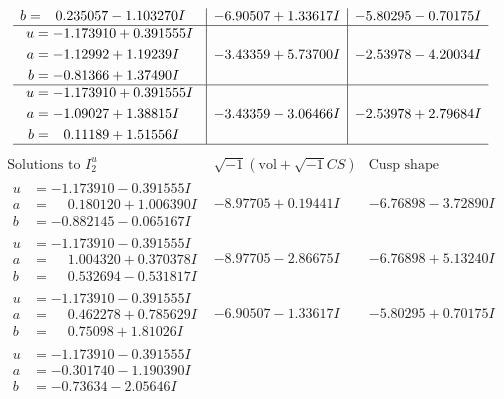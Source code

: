 \documentclass[1p]{elsarticle_modified}
\theoremstyle{definition}
\newcommand{\I}{\sqrt{-1}}
\begin{document}
$$\begin{array}{c|c|c}
\begin{aligned}
b &= \phantom{-}0.235057 - 1.103270 I\end{aligned}
 & -6.90507 + 1.33617 I & -5.80295 - 0.70175 I \\ \hline\begin{aligned}
u &= -1.173910 + 0.391555 I \\
a &= -1.12992 + 1.19239 I \\
b &= -0.81366 + 1.37490 I\end{aligned}
 & -3.43359 + 5.73700 I & -2.53978 - 4.20034 I \\ \hline\begin{aligned}
u &= -1.173910 + 0.391555 I \\
a &= -1.09027 + 1.38815 I \\
b &= \phantom{-}0.11189 + 1.51556 I\end{aligned}
 & -3.43359 - 3.06466 I & -2.53978 + 2.79684 I\\
 \hline 
 \end{array}$$\newpage$$\begin{array}{c|c|c}  
\text{Solutions to }I^u_{2}& \I (\text{vol} + \sqrt{-1}CS) & \text{Cusp shape}\\
 \hline 
\begin{aligned}
u &= -1.173910 - 0.391555 I \\
a &= \phantom{-}0.180120 + 1.006390 I \\
b &= -0.882145 - 0.065167 I\end{aligned}
 & -8.97705 + 0.19441 I & -6.76898 - 3.72890 I \\ \hline\begin{aligned}
u &= -1.173910 - 0.391555 I \\
a &= \phantom{-}1.004320 + 0.370378 I \\
b &= \phantom{-}0.532694 - 0.531817 I\end{aligned}
 & -8.97705 - 2.86675 I & -6.76898 + 5.13240 I \\ \hline\begin{aligned}
u &= -1.173910 - 0.391555 I \\
a &= \phantom{-}0.462278 + 0.785629 I \\
b &= \phantom{-}0.75098 + 1.81026 I\end{aligned}
 & -6.90507 - 1.33617 I & -5.80295 + 0.70175 I \\ \hline\begin{aligned}
u &= -1.173910 - 0.391555 I \\
a &= -0.301740 - 1.190390 I \\
b &= -0.73634 - 2.05646 I\end{aligned}

\end{array}$$
\end{document}
